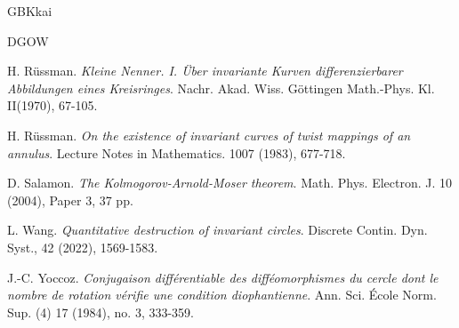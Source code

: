 \documentclass{amsart}
\theoremstyle{definition}
\begin{document}
\begin{CJK*}{GBK}{kai}
\begin{thebibliography}{DGOW}
			
			 H. R\"{u}ssman.  {\it Kleine Nenner. I. \"{U}ber invariante Kurven differenzierbarer Abbildungen eines Kreisringes}. Nachr. Akad. Wiss. G\"{o}ttingen Math.-Phys. Kl. II(1970), 67-105.
			
			
			
			 H. R\"{u}ssman. {\it On the existence of invariant curves of twist mappings of an annulus}.
			Lecture Notes in Mathematics.  {1007} (1983),  677-718.
			
			
			
			 D. Salamon. {\it The Kolmogorov-Arnold-Moser theorem}.
			Math. Phys. Electron. J. 10 (2004), Paper 3, 37 pp.
			
			
			
			
			
			

 L. Wang. {\it Quantitative destruction of invariant circles}. {Discrete Contin. Dyn. Syst.},  42 (2022), 1569-1583.

			
			 J.-C. Yoccoz. {\it
				Conjugaison diff\'{e}rentiable des diff\'{e}omorphismes du cercle dont le nombre de rotation v\'{e}rifie une condition diophantienne}.
			Ann. Sci. \'{E}cole Norm. Sup. (4) 17 (1984), no. 3, 333-359.
			
			
			
			
			
			
			

\end{thebibliography}
\end{CJK*}
\end{document}
